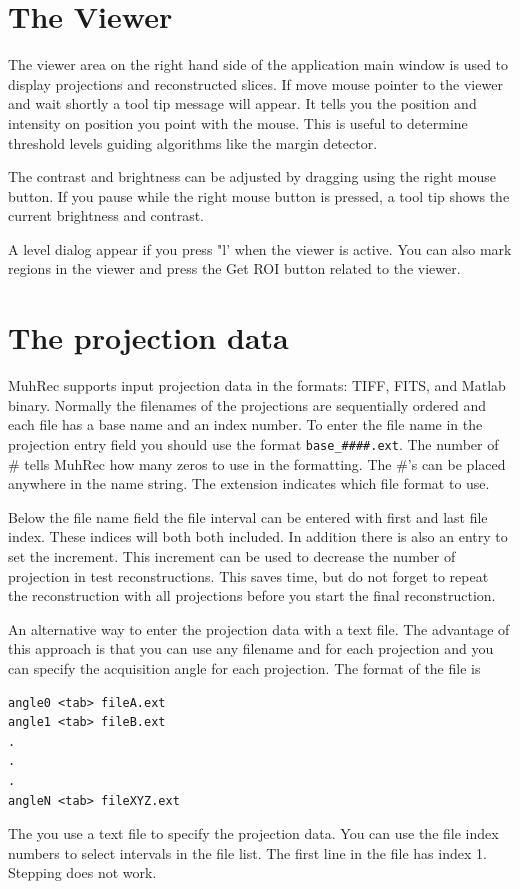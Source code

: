 \documentclass[a4paper]{scrreprt}
\begin{document}
\section{The Viewer}
The viewer area on the right hand side of the application main window is used to
display projections and reconstructed slices. If move mouse pointer to the
viewer and wait shortly a tool tip message will appear. It tells you the
position and intensity on position you point with the mouse. This is useful to
determine threshold levels guiding algorithms like the margin detector.

The contrast and brightness can be adjusted by dragging using the right mouse
button. If you pause while the right mouse button is pressed, a tool tip shows
the current brightness and contrast.

A level dialog appear if you press "l' when the viewer is active. You can also mark regions in the viewer and press the Get ROI button related to the viewer. 


\section{The projection data}
MuhRec supports input projection data in the formats: TIFF, FITS, and Matlab
binary. Normally the filenames of the projections are sequentially ordered and
each file has a base name and an index number. To enter the file name in the
projection entry field you should use the format \verb+base_####.ext+. The
number of \# tells MuhRec how many zeros to use in the formatting. The \#'s can
be placed anywhere in the name string. The extension indicates which file format
to use.

Below the file name field the file interval can be entered with first and last
file index. These indices will both both included. In addition there is also an
entry to set the increment. This increment can be used to decrease the number of
projection in test reconstructions. This saves time, but do not forget to repeat
the reconstruction with all projections before you start the final
reconstruction.

An alternative way to enter the projection data with a text file. The advantage
of this approach is that you can use any filename and for each projection and
you can specify the acquisition angle for each projection.
The format of the file is
\begin{verbatim}
angle0 <tab> fileA.ext
angle1 <tab> fileB.ext
.
.
.
angleN <tab> fileXYZ.ext
\end{verbatim}
The you use a text file to specify the projection data. You can use the file
index numbers to select intervals in the file list. The first line in the file
has index 1. Stepping does not work.
\end{document}
